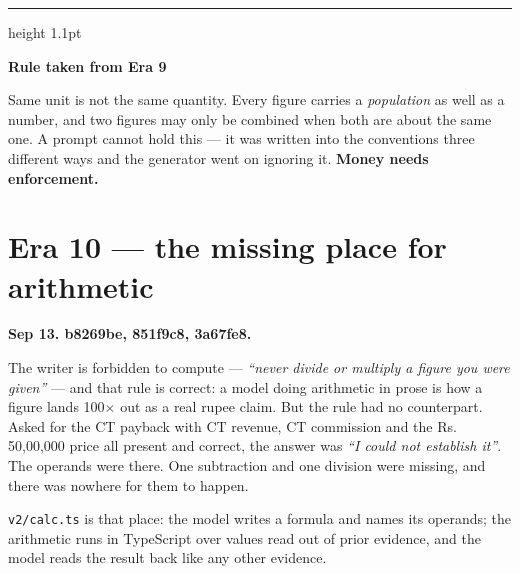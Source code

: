 \documentclass[11pt,a4paper]{report}
\newcommand{\rs}[1]{Rs.\,#1}
\newcommand{\file}[1]{\texttt{\small #1}}
\newcommand{\code}[1]{\texttt{\small #1}}
\newcommand{\sha}[1]{{\ttfamily\small\color{slate}#1}}
\newenvironment{keybox}[1]
 {\par\medskip\begin{center}\begin{minipage}{0.94\textwidth}%
  {\color{navy}\hrule height 1.1pt}\vspace{5pt}\par
  \textbf{\color{navy}#1}\par\vspace{3pt}\small}
 {\par\vspace{5pt}{\color{mist}\hrule height 0.8pt}\end{minipage}\end{center}\medskip}
\newenvironment{fitpic}
  {\par\medskip\begin{center}\begin{lrbox}{\fitbox}}
  {\end{lrbox}%
   \ifdim\wd\fitbox>\textwidth \resizebox{\textwidth}{!}{\usebox{\fitbox}}%
   \else \usebox{\fitbox}\fi
   \end{center}\medskip}
\begin{document}
\begin{keybox}{Rule taken from Era 9}
Same unit is not the same quantity. Every figure carries a \emph{population} as well as a number,
and two figures may only be combined when both are about the same one. A prompt cannot hold this ---
it was written into the conventions three different ways and the generator went on ignoring it.
\textbf{Money needs enforcement.}
\end{keybox}

\section{Era 10 --- the missing place for arithmetic}
\label{sec:era10}

\textbf{Sep 13. \sha{b8269be}, \sha{851f9c8}, \sha{3a67fe8}.}

The writer is forbidden to compute --- \emph{``never divide or multiply a figure you were given''}
--- and that rule is correct: a model doing arithmetic in prose is how a figure lands 100$\times$
out as a real rupee claim. But the rule had no counterpart. Asked for the CT payback with CT
revenue, CT commission and the \rs{50,00,000} price all present and correct, the answer was
\emph{``I could not establish it''}. The operands were there. One subtraction and one division were
missing, and there was nowhere for them to happen.

\file{v2/calc.ts} is that place: the model writes a formula and names its operands; the arithmetic
runs in TypeScript over values read out of prior evidence, and the model reads the result back like
any other evidence.

\begin{fitpic}
\end{fitpic}
\end{document}
